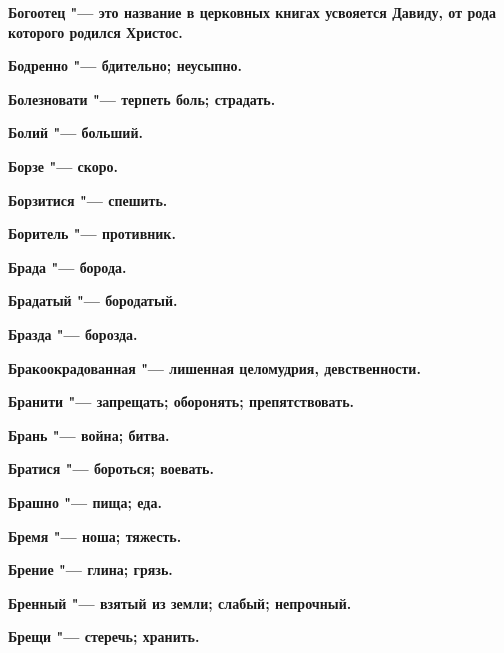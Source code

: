 \bfseries Богоотец \normalfont{} "--- это название в церковных книгах усвояется Давиду, от рода которого родился Христос. 




\bfseries Бодренно \normalfont{} "--- бдительно; неусыпно. 




\bfseries Болезновати \normalfont{} "--- терпеть боль; страдать. 




\bfseries Болий \normalfont{} "--- больший. 




\bfseries Борзе \normalfont{} "--- скоро. 




\bfseries Борзитися \normalfont{} "--- спешить. 




\bfseries Боритель \normalfont{} "--- противник. 




\bfseries Брада \normalfont{} "--- борода. 




\bfseries Брадатый \normalfont{} "--- бородатый. 




\bfseries Бразда \normalfont{} "--- борозда. 




\bfseries Бракоокрадованная \normalfont{} "--- лишенная целомудрия, девственности. 




\bfseries Бранити \normalfont{} "--- запрещать; оборонять; препятствовать. 




\bfseries Брань \normalfont{} "--- война; битва. 




\bfseries Братися \normalfont{} "--- бороться; воевать. 




\bfseries Брашно \normalfont{} "--- пища; еда. 




\bfseries Бремя \normalfont{} "--- ноша; тяжесть. 




\bfseries Брение \normalfont{} "--- глина; грязь. 




\bfseries Бренный \normalfont{} "--- взятый из земли; слабый; непрочный. 




\bfseries Брещи \normalfont{} "--- стеречь; хранить. 




